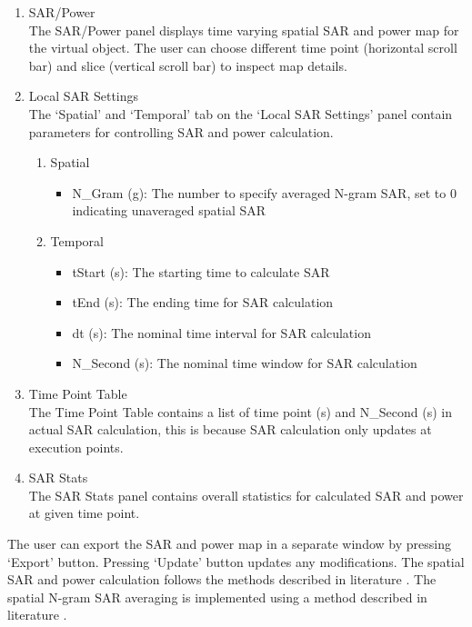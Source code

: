 \documentclass{book}%
\begin{document}
\begin{enumerate}
	\item SAR/Power \\
The SAR/Power panel displays time varying spatial SAR and power map for the virtual object. The user can choose different time point (horizontal scroll bar) and slice (vertical scroll bar) to inspect map details.
	
 \item Local SAR Settings\\
The `Spatial' and `Temporal' tab on the `Local SAR Settings' panel contain parameters for controlling SAR and power calculation.

\begin{enumerate}
\item Spatial \\
\begin{itemize}
	\item N\_Gram (g): The number to specify averaged N-gram SAR, set to 0 indicating unaveraged spatial SAR
\end{itemize}

\item Temporal \\
\begin{itemize}
	\item tStart (s): The starting time to calculate SAR
	\item tEnd (s): The ending time for SAR calculation
	\item dt (s): The nominal time interval for SAR calculation
	\item N\_Second (s): The nominal time window for SAR calculation
\end{itemize}
\end{enumerate}

\item Time Point Table\\
The Time Point Table contains a list of time point (s) and N\_Second (s) in actual SAR calculation, this is because SAR calculation only updates at execution points.

\item SAR Stats \\
The SAR Stats panel contains overall statistics for calculated SAR and power at given time point.

\end{enumerate}

The user can export the SAR and power map in a separate window by pressing `Export' button. Pressing `Update' button updates any modifications. The spatial SAR and power calculation follows the methods described in literature \cite{Collins2001,Cao2014}. The spatial N-gram SAR averaging is implemented using a method described in literature \cite{Carluccio2013}.
\end{document}
